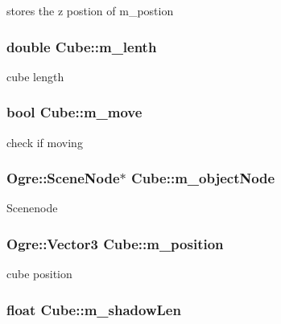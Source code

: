 stores the z postion of m\-\_\-postion \hypertarget{class_cube_aa06856d486384e88a787d800fb981d6d}{
\subsubsection[{m\-\_\-lenth}]{\setlength{\rightskip}{0pt plus 5cm}double Cube\-::m\-\_\-lenth\hspace{0.3cm}{\ttfamily [private]}}}\label{class_cube_aa06856d486384e88a787d800fb981d6d}
cube length \hypertarget{class_cube_a5e8d56fc07da94b47dd527b80d2f5b42}{
\subsubsection[{m\-\_\-move}]{\setlength{\rightskip}{0pt plus 5cm}bool Cube\-::m\-\_\-move}}\label{class_cube_a5e8d56fc07da94b47dd527b80d2f5b42}
check if moving \hypertarget{class_cube_adb69c60fc68857cb95c19aa45be0bc06}{
\subsubsection[{m\-\_\-object\-Node}]{\setlength{\rightskip}{0pt plus 5cm}Ogre\-::\-Scene\-Node$\ast$ Cube\-::m\-\_\-object\-Node\hspace{0.3cm}{\ttfamily [private]}}}\label{class_cube_adb69c60fc68857cb95c19aa45be0bc06}
Scenenode \hypertarget{class_cube_aa5ab2527959955b999b24f175c8451cd}{
\subsubsection[{m\-\_\-position}]{\setlength{\rightskip}{0pt plus 5cm}Ogre\-::\-Vector3 Cube\-::m\-\_\-position}}\label{class_cube_aa5ab2527959955b999b24f175c8451cd}
cube position \hypertarget{class_cube_abf7ae874f1da5c76795c8aa15fa8dc36}{
\subsubsection[{m\-\_\-shadow\-Len}]{\setlength{\rightskip}{0pt plus 5cm}float Cube\-::m\-\_\-shadow\-Len}}\label{class_cube_abf7ae874f1da5c76795c8aa15fa8dc36}

